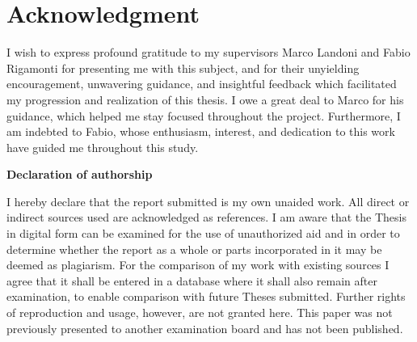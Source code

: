 \documentclass[a4paper, 11pt]{report}
\makeatletter
\theoremstyle{definition}
\def\cleardoublepage{\clearpage\if@twoside \ifodd\c@page\else%
    \hbox{}%
    \thispagestyle{empty}%
    \newpage%
    \if@twocolumn\hbox{}\newpage\fi\fi\fi}
\def\cleardoublepage{\clearpage\if@twoside \ifodd\c@page\else%
    \hbox{}%
    \thispagestyle{empty}%
    \newpage%
    \if@twocolumn\hbox{}\newpage\fi\fi\fi}
\makeatother
\begin{document}
\newpage
\section*{Acknowledgment}

I wish to express profound gratitude to my supervisors Marco Landoni and Fabio Rigamonti for presenting me with this  subject, and for their unyielding encouragement, unwavering guidance, and insightful feedback which facilitated my progression and realization of this thesis. I owe a great deal to Marco for his guidance, which helped me stay focused throughout the project. Furthermore, I am indebted to Fabio, whose enthusiasm, interest, and dedication to this work have guided me throughout this study.

\tableofcontents
\listoffigures
\listoftables


        \pagestyle{fancy}
        \renewcommand{\chaptermark}[1]{\markboth{#1}{}} 
        \renewcommand{\sectionmark}[1]{\markright{\thesection\ #1}} 
        \fancyhf{} %
        \fancyhead[LE,RO]{\bfseries\thepage} 
        \fancyhead[LO]{\bfseries\rightmark} 
        \fancyhead[RE]{\bfseries\leftmark} 
        \renewcommand{\headrulewidth}{0.8pt} 
        \renewcommand{\footrulewidth}{0pt} 
        \addtolength{\headheight}{0.5pt} %
        \fancypagestyle{plain}{%
        \fancyhead{} %
        \fancyfoot[C]{\bfseries \thepage}
        \renewcommand{\headrulewidth}{0pt} %
        } 

        \cleardoublepage{}
        \setcounter{page}{1}







\appendix 





\newpage
\Large
\noindent
\textbf{Declaration of authorship} 
\vspace{0.5cm}
\noindent
\normalsize

I hereby declare that the report submitted is my own unaided work. All direct 
or indirect sources used are acknowledged as references. I am aware that the 
Thesis in digital form can be examined for the use of unauthorized aid and in 
order to determine whether the report as a whole or parts incorporated in it may 
be deemed as plagiarism. For the comparison of my work with existing sources I 
agree that it shall be entered in a database where it shall also remain after 
examination, to enable comparison with future Theses submitted. Further rights 
of reproduction and usage, however, are not granted here. This paper was not 
previously presented to another examination board and has not been published.



\end{document}
